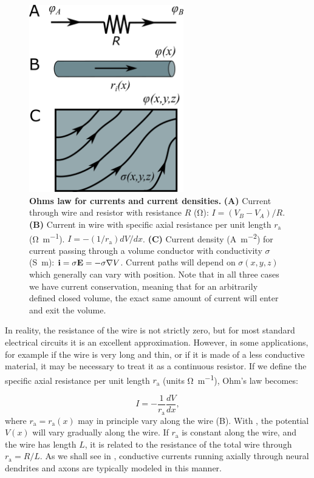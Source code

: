 \begin{figure}[!ht]
\begin{center}
\includegraphics[width=0.6\textwidth]{Figures/Basics/Currents.png}
\end{center}
\caption{{\bf Ohms law for currents and current densities.} {\bf (A)} Current through wire and resistor with resistance $R$ (\si{\ohm}): $I = (V_B-V_A)/R$. {\bf (B)} Current in wire with specific axial resistance per unit length $r_\text{a}$ (\si{\ohm\per\metre}).  $I=- (1/r_\text{a}) dV/dx$. {\bf (C)} Current density (\si{\ampere\per\square\metre}) for current passing through a volume conductor with conductivity $\sigma$ (\si{\siemens\metre}): ${\bf i} = \sigma {\bf E} = - \sigma {\bf \nabla} V$. Current paths will depend on $\sigma(x,y,z)$ which generally can vary with position. Note that in all three cases we have current conservation, meaning that for an arbitrarily defined closed volume, the exact same amount of current will enter and exit the volume.
}
\label{fig:Basics:Currents}
\end{figure}
In reality, the resistance of the wire is not strictly zero, but for most standard electrical circuits it is an excellent approximation. However, in some applications, for example if the wire is very long and thin, or if it is made of a less conductive material, it may be necessary to treat it as a continuous resistor. If we define the specific axial resistance per unit length $r_\text{a}$ (units \si{\ohm\per\metre}), Ohm's law becomes:

\begin{equation}
I = - \frac{1}{r_\text{a}}\frac{dV}{dx},
\label{eq:Basics:Ohm_r}
\end{equation}
where $r_\text{a}=r_\text{a}(x)$ may in principle vary along the wire (B). With , the potential $V(x)$ will vary gradually along the wire. If $r_\text{a}$ is constant along the wire, and the wire has length $L$, it is related to the resistance of the total wire through $r_\text{a}=R/L$. As we shall see in , conductive currents running axially through neural dendrites and axons are typically modeled in this manner. 

